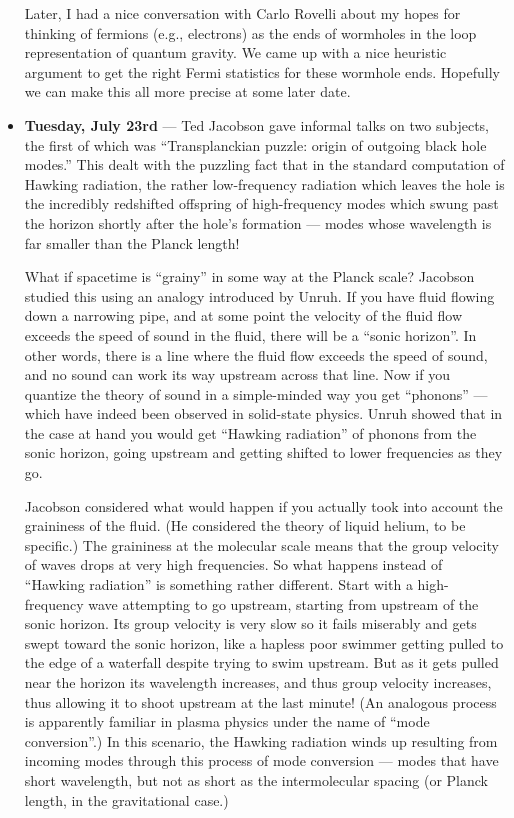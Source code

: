 \documentclass{article}
\begin{document}
\begin{itemize}
  Later, I had a nice conversation with Carlo Rovelli about my hopes for
  thinking of fermions (e.g., electrons) as the ends of wormholes in the
  loop representation of quantum gravity. We came up with a nice
  heuristic argument to get the right Fermi statistics for these
  wormhole ends. Hopefully we can make this all more precise at some
  later date.
\item
  \textbf{Tuesday, July 23rd} --- Ted Jacobson gave informal talks on
  two subjects, the first of which was ``Transplanckian puzzle: origin
  of outgoing black hole modes.'' This dealt with the puzzling fact that
  in the standard computation of Hawking radiation, the rather
  low-frequency radiation which leaves the hole is the incredibly
  redshifted offspring of high-frequency modes which swung past the
  horizon shortly after the hole's formation --- modes whose wavelength
  is far smaller than the Planck length!

  What if spacetime is ``grainy'' in some way at the Planck scale?
  Jacobson studied this using an analogy introduced by Unruh. If you
  have fluid flowing down a narrowing pipe, and at some point the
  velocity of the fluid flow exceeds the speed of sound in the fluid,
  there will be a ``sonic horizon''. In other words, there is a line
  where the fluid flow exceeds the speed of sound, and no sound can work
  its way upstream across that line. Now if you quantize the theory of
  sound in a simple-minded way you get ``phonons'' --- which have indeed
  been observed in solid-state physics. Unruh showed that in the case at
  hand you would get ``Hawking radiation'' of phonons from the sonic
  horizon, going upstream and getting shifted to lower frequencies as
  they go.

  Jacobson considered what would happen if you actually took into
  account the graininess of the fluid. (He considered the theory of
  liquid helium, to be specific.) The graininess at the molecular scale
  means that the group velocity of waves drops at very high frequencies.
  So what happens instead of ``Hawking radiation'' is something rather
  different. Start with a high-frequency wave attempting to go upstream,
  starting from upstream of the sonic horizon. Its group velocity is
  very slow so it fails miserably and gets swept toward the sonic
  horizon, like a hapless poor swimmer getting pulled to the edge of a
  waterfall despite trying to swim upstream. But as it gets pulled near
  the horizon its wavelength increases, and thus group velocity
  increases, thus allowing it to shoot upstream at the last minute! (An
  analogous process is apparently familiar in plasma physics under the
  name of ``mode conversion''.) In this scenario, the Hawking radiation
  winds up resulting from incoming modes through this process of mode
  conversion --- modes that have short wavelength, but not as short as
  the intermolecular spacing (or Planck length, in the gravitational
  case.)


\end{itemize}
\end{document}

